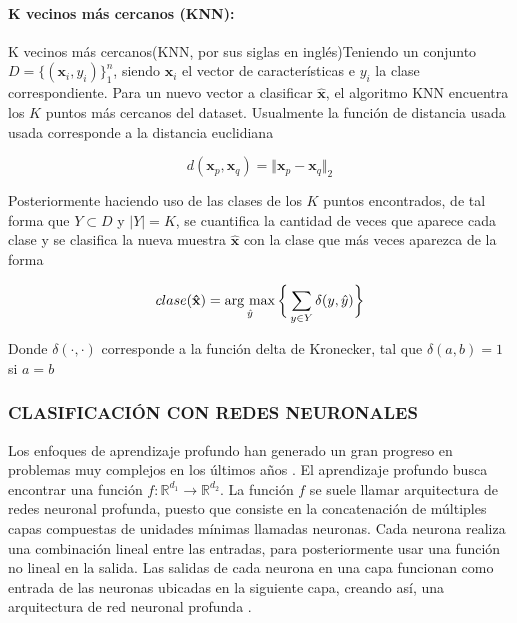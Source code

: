 \paragraph{K vecinos más cercanos (KNN):}

K vecinos más cercanos(KNN, por sus siglas en inglés)Teniendo un conjunto $D = \{(\mathbf{x}_i, y_i)\}_1^n$, siendo $\mathbf{x}_i$ el vector de características e $y_i$ la clase correspondiente. Para un nuevo vector a clasificar $\mathbf{\hat{x}}$, el algoritmo KNN encuentra los $K$ puntos más cercanos del dataset. Usualmente la función de distancia usada usada corresponde a la distancia euclidiana

\begin{equation}
    d(\mathbf{x}_p,\mathbf{x}_q) = \Vert \mathbf{x}_p-\mathbf{x}_q \Vert_2
    \label{eq:distancia_euclidiana}
\end{equation}

Posteriormente haciendo uso de las clases de los $K$ puntos encontrados, de tal forma que $Y \subset D$ y $\vert Y \vert = K$, se cuantifica la cantidad de veces que aparece cada clase y se clasifica la nueva muestra $\mathbf{\hat{x}}$ con la clase que más veces aparezca de la forma

\begin{equation}
    clase(\mathbf{\hat{x}}) =  \operatorname*{arg \ max}_{\hat{y}} \bigg\{ \sum_{y \in Y} \delta(y,\hat{y})\bigg\}
\end{equation}

Donde $\delta(\cdot,\cdot)$ corresponde a la función delta de Kronecker, tal que $\delta(a,b) = 1$ si $a=b$


\subsubsection{CLASIFICACIÓN CON REDES NEURONALES}

Los enfoques de aprendizaje profundo han generado un gran progreso en problemas muy complejos en los últimos años
\cite{he2016deep,li2019deep,li2018deep, wang2019development,wu2016google}. El aprendizaje profundo busca encontrar una función $f: \mathbb{R}^{d_1} \rightarrow \mathbb{R}^{d_2}$. La función $f$ se suele llamar arquitectura de redes neuronal profunda, puesto que consiste en la concatenación de múltiples capas compuestas de unidades mínimas llamadas neuronas. Cada neurona realiza una combinación lineal entre las entradas, para posteriormente usar una función no lineal en la salida. Las salidas de cada neurona en una capa funcionan como entrada de las neuronas ubicadas en la siguiente capa, creando así, una arquitectura de red neuronal profunda \cite{fan2019selective}. 

